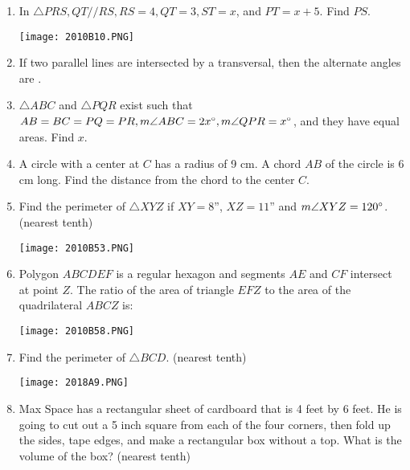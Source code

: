 \documentclass[../uilmath.tex]{subfiles}
\begin{document}
\begin{enumerate}[label=\bfseries\arabic*.]
    \item %
    In $\triangle PRS, QT // RS, RS=4, QT=3, ST=x$, and $PT=x+5$. Find $PS$.
    \begin{center}
        \texttt{[image: 2010B10.PNG]}
    \end{center}

    \item %
    If two parallel lines are intersected by a transversal, then the alternate angles are \blank .

    \item %
    $\triangle ABC$ and $\triangle PQR$ exist such that $AB=BC=PQ=PR, m\angle ABC = 2x\degree, m\angle QPR = x\degree$, and they have equal areas. Find $x$.

    \item %
    A circle with a center at $C$ has a radius of 9 cm. A chord $AB$ of the circle is 6 cm long. Find the distance from the chord to the center $C$.

    \item %
    Find the perimeter of $\triangle XYZ$ if $XY=8$'', $XZ=11$'' and $m\angle XYZ=120\degree$. (nearest tenth)
    \begin{center}
        \texttt{[image: 2010B53.PNG]}
    \end{center}

    \item %
    Polygon $ABCDEF$ is a regular hexagon and segments $AE$ and $CF$ intersect at point $Z$. The ratio of the area of triangle $EFZ$ to the area of the quadrilateral $ABCZ$ is:
    \begin{center}
        \texttt{[image: 2010B58.PNG]}
    \end{center}

    \item %
    Find the perimeter of $\triangle BCD$. (nearest tenth)
    \begin{center}
        \texttt{[image: 2018A9.PNG]}
    \end{center}

    \item %
    Max Space has a rectangular sheet of cardboard that is 4 feet by 6 feet. He is going to cut out a 5 inch square from each of the four corners, 
    then fold up the sides, tape edges, and make a rectangular box without a top. What is the volume of the box? (nearest tenth)


\end{enumerate}
\end{document}
